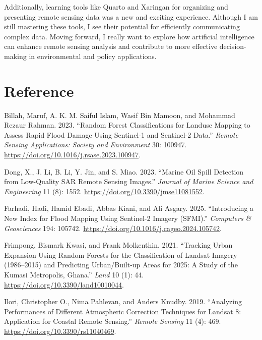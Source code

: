 \documentclass[
  letterpaper,
]{scrbook}
\newlength{\cslhangindent}
\newenvironment{CSLReferences}[2] %
 {\begin{list}{}{%
  \setlength{\itemindent}{0pt}
  \setlength{\leftmargin}{0pt}
  \setlength{\parsep}{0pt}
  \ifodd #1
   \setlength{\leftmargin}{\cslhangindent}
   \setlength{\itemindent}{-1\cslhangindent}
  \fi
  \setlength{\itemsep}{#2\baselineskip}}}
 {\end{list}}
\begin{document}
Additionally, learning tools like Quarto and Xaringan for organizing and
presenting remote sensing data was a new and exciting experience.
Although I am still mastering these tools, I see their potential for
efficiently communicating complex data. Moving forward, I really want to
explore how artificial intelligence can enhance remote sensing analysis
and contribute to more effective decision-making in environmental and
policy applications.

\section*{Reference}\label{reference-6}

\label{refs}
\begin{CSLReferences}{1}{0}
Billah, Maruf, A. K. M. Saiful Islam, Wasif Bin Mamoon, and Mohammad
Rezaur Rahman. 2023. {``Random Forest Classifications for Landuse
Mapping to Assess Rapid Flood Damage Using {Sentinel-1} and {Sentinel-2}
Data.''} \emph{Remote Sensing Applications: Society and Environment} 30:
100947. \url{https://doi.org/10.1016/j.rsase.2023.100947}.

Dong, X., J. Li, B. Li, Y. Jin, and S. Miao. 2023. {``Marine Oil Spill
Detection from Low-Quality SAR Remote Sensing Images.''} \emph{Journal
of Marine Science and Engineering} 11 (8): 1552.
\url{https://doi.org/10.3390/jmse11081552}.

Farhadi, Hadi, Hamid Ebadi, Abbas Kiani, and Ali Asgary. 2025.
{``Introducing a New Index for Flood Mapping Using {Sentinel-2} Imagery
({SFMI}).''} \emph{Computers \& Geosciences} 194: 105742.
\url{https://doi.org/10.1016/j.cageo.2024.105742}.

Frimpong, Bismark Kwasi, and Frank Molkenthin. 2021. {``Tracking Urban
Expansion Using Random Forests for the Classification of Landsat Imagery
(1986--2015) and Predicting Urban/Built-up Areas for 2025: A Study of
the Kumasi Metropolis, Ghana.''} \emph{Land} 10 (1): 44.
\url{https://doi.org/10.3390/land10010044}.

Ilori, Christopher O., Nima Pahlevan, and Anders Knudby. 2019.
{``Analyzing Performances of Different Atmospheric Correction Techniques
for {Landsat} 8: Application for Coastal Remote Sensing.''} \emph{Remote
Sensing} 11 (4): 469. \url{https://doi.org/10.3390/rs11040469}.


\end{CSLReferences}
\end{document}
